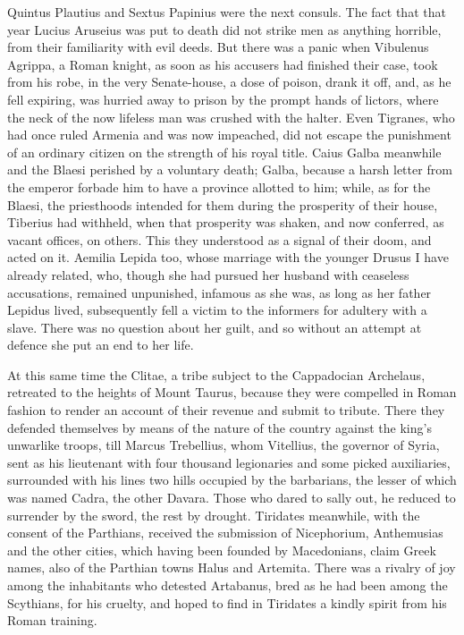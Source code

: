 Quintus Plautius and Sextus Papinius were the next consuls. The fact that that year Lucius Aruseius was put to death did not strike men as anything horrible, from their familiarity with evil deeds. But there was a panic when Vibulenus Agrippa, a Roman knight, as soon as his accusers had finished their case, took from his robe, in the very Senate-house, a dose of poison, drank it off, and, as he fell expiring, was hurried away to prison by the prompt hands of lictors, where the neck of the now lifeless man was crushed with the halter. Even Tigranes, who had once ruled Armenia and was now impeached, did not escape the punishment of an ordinary citizen on the strength of his royal title. Caius Galba meanwhile and the Blaesi perished by a voluntary death; Galba, because a harsh letter from the emperor forbade him to have a province allotted to him; while, as for the Blaesi, the priesthoods intended for them during the prosperity of their house, Tiberius had withheld, when that prosperity was shaken, and now conferred, as vacant offices, on others. This they understood as a signal of their doom, and acted on it. Aemilia Lepida too, whose marriage with the younger Drusus I have already related, who, though she had pursued her husband with ceaseless accusations, remained unpunished, infamous as she was, as long as her father Lepidus lived, subsequently fell a victim to the informers for adultery with a slave. There was no question about her guilt, and so without an attempt at defence she put an end to her life.


At this same time the Clitae, a tribe subject to the Cappadocian Archelaus, retreated to the heights of Mount Taurus, because they were compelled in Roman fashion to render an account of their revenue and submit to tribute. There they defended themselves by means of the nature of the country against the king's unwarlike troops, till Marcus Trebellius, whom Vitellius, the governor of Syria, sent as his lieutenant with four thousand legionaries and some picked auxiliaries, surrounded with his lines two hills occupied by the barbarians, the lesser of which was named Cadra, the other Davara. Those who dared to sally out, he reduced to surrender by the sword, the rest by drought. Tiridates meanwhile, with the consent of the Parthians, received the submission of Nicephorium, Anthemusias and the other cities, which having been founded by Macedonians, claim Greek names, also of the Parthian towns Halus and Artemita. There was a rivalry of joy among the inhabitants who detested Artabanus, bred as he had been among the Scythians, for his cruelty, and hoped to find in Tiridates a kindly spirit from his Roman training.

